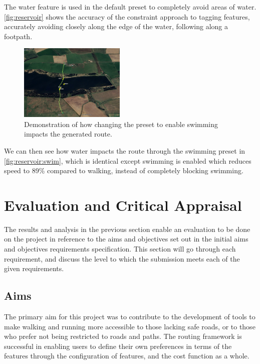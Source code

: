 \documentclass[12pt]{article}
\begin{document}
The water feature is used in the default preset to completely avoid areas of water. \autoref{fig:reservoir} shows the accuracy of the constraint approach to tagging features, accurately avoiding closely along the edge of the water, following along a footpath.

\begin{figure}[H]
  \centering
  \includegraphics[width=0.45\textwidth]{assets/reservoir-swim.png}
  \caption{Demonstration of how changing the preset to enable swimming impacts the generated route.}
  \label{fig:reservoir:swim}
\end{figure}

We can then see how water impacts the route through the swimming preset in \autoref{fig:reservoir:swim}, which is identical except swimming is enabled which reduces speed to 89\% compared to walking, instead of completely blocking swimming.

\section{Evaluation and Critical Appraisal}

The results and analysis in the previous section enable an evaluation to be done on the project in reference to the aims and objectives set out in the initial aims and objectives requirements specification. This section will go through each requirement, and discuss the level to which the submission meets each of the given requirements.

\subsection{Aims}

The primary aim for this project was to contribute to the development of tools to make walking and running more accessible to those lacking safe roads, or to those who prefer not being restricted to roads and paths. The routing framework is successful in enabling users to define their own preferences in terms of the features through the configuration of features, and the cost function as a whole.
\end{document}
